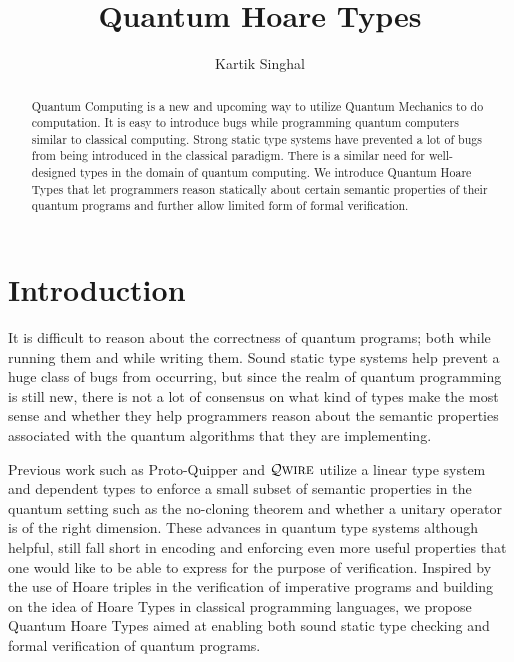 \documentclass[acmsmall,nonacm,review,timestamp]{acmart}
\newcommand{\qwire}{\ensuremath{\mathcal{Q}\textsc{wire}}\xspace}
\begin{document}
\title{Quantum Hoare Types}         %

\author{Kartik Singhal}


\begin{abstract}
	Quantum Computing is a new and upcoming way to utilize Quantum Mechanics to do computation. It is easy to introduce bugs while programming quantum computers similar to classical computing. Strong static type systems have prevented a lot of bugs from being introduced in the classical paradigm. There is a similar need for well-designed types in the domain of quantum computing. We introduce Quantum Hoare Types that let programmers reason statically about certain semantic properties of their quantum programs and further allow limited form of formal verification.

\end{abstract}



\maketitle


\section{Introduction}
%
%


It is difficult to reason about the correctness of quantum programs; both while running them and while writing them. Sound static type systems help prevent a huge class of bugs from occurring, but since the realm of quantum programming is still new, there is not a lot of consensus on what kind of types make the most sense and whether they help programmers reason about the semantic properties associated with the quantum algorithms that they are implementing.

Previous work such as Proto-Quipper\cite{ross2015algebraic} and \qwire\cite{paykin2018,rand2018a} utilize a linear type system and dependent types to enforce a small subset of semantic properties in the quantum setting such as the no-cloning theorem and whether a unitary operator is of the right dimension. These advances in quantum type systems although helpful, still fall short in encoding and enforcing even more useful properties that one would like to be able to express for the purpose of verification. Inspired by the use of Hoare triples in the verification of imperative programs and building on the idea of Hoare Types in classical programming languages\cite{nanevski2008}, we propose Quantum Hoare Types aimed at enabling both sound static type checking and formal verification of quantum programs.
\end{document}
